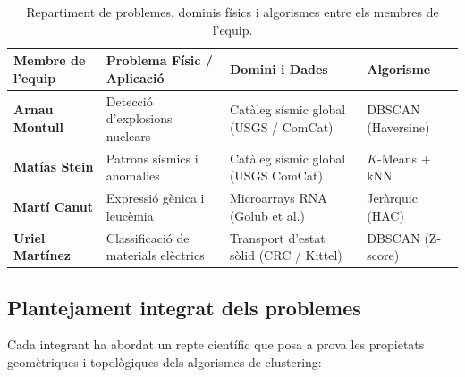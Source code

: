 \documentclass[a4paper,11pt]{article}
\begin{document}
\begin{table}[H]
\centering
\small
\renewcommand{\arraystretch}{1.2}
\begin{tabularx}{\textwidth}{@{}l>{\raggedright\arraybackslash}p{4.2cm}>{\raggedright\arraybackslash}X>{\raggedright\arraybackslash}p{2.8cm}@{}}
\toprule
\textbf{Membre de l'equip} & \textbf{Problema Físic / Aplicació} & \textbf{Domini i Dades} & \textbf{Algorisme} \\
\midrule
\textbf{Arnau Montull} & Detecció d'explosions nuclears & Catàleg sísmic global (USGS / ComCat) & DBSCAN (Haversine) \\
\addlinespace
\textbf{Matías Stein} & Patrons sísmics i anomalies & Catàleg sísmic global (USGS ComCat) & $K$-Means + kNN \\
\addlinespace
\textbf{Martí Canut} & Expressió gènica i leucèmia & Microarrays RNA (Golub et al.) & Jeràrquic (HAC) \\
\addlinespace
\textbf{Uriel Martínez} & Classificació de materials elèctrics & Transport d'estat sòlid (CRC / Kittel) & DBSCAN (Z-score) \\
\bottomrule
\end{tabularx}
\caption{Repartiment de problemes, dominis físics i algorismes entre els membres de l'equip.}
\label{tab:repartiment}
\end{table}

\subsection{Plantejament integrat dels problemes}

Cada integrant ha abordat un repte científic que posa a prova les propietats geomètriques i topològiques dels algorismes de clustering:
\end{document}
